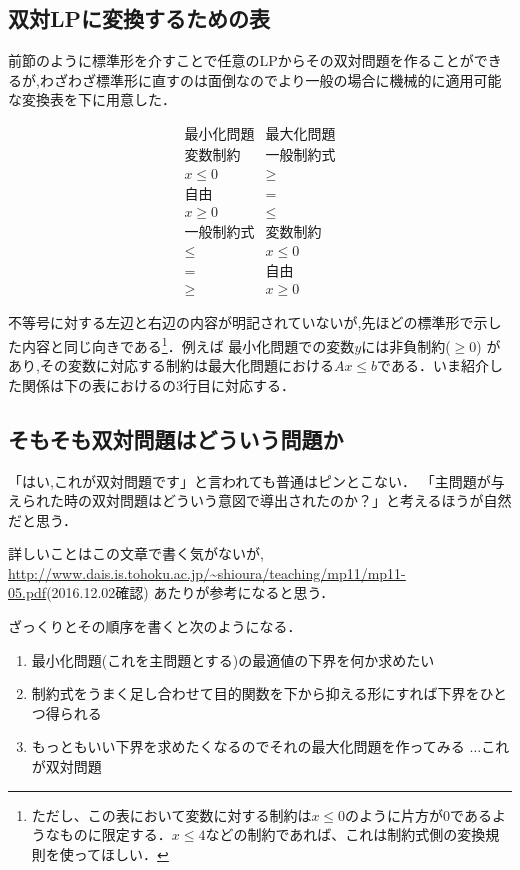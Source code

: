 \documentclass[13pt]{jarticle}
\theoremstyle{nonitalic} %
\begin{document}
\subsection{双対LPに変換するための表}

前節のように標準形を介すことで任意のLPからその双対問題を作ることができるが,わざわざ標準形に直すのは面倒なのでより一般の場合に機械的に適用可能な変換表を下に用意した．


\begin{equation*}
\begin{array}{c|c}
  \textrm{最小化問題} &  \textrm{最大化問題} \\ \hline \hline
  \textrm{変数制約}  &  \textrm{一般制約式} \\ \hline
  x \leq 0 & \geq \\
  \textrm{自由} & = \\
  x \geq 0 & \leq \\ \hline \hline
  \textrm{一般制約式} & \textrm{変数制約} \\ \hline
  \leq & x \leq 0 \\
   =   & \textrm{自由} \\
  \geq & x \geq 0
\end{array}
\end{equation*}

不等号に対する左辺と右辺の内容が明記されていないが,先ほどの標準形で示した内容と同じ向きである\footnote{ただし、この表において変数に対する制約は$x \leq 0$のように片方が0であるようなものに限定する．$ x \leq 4$などの制約であれば、これは制約式側の変換規則を使ってほしい．}．例えば 最小化問題での変数$y$には非負制約($ \geq 0$) があり,その変数に対応する制約は最大化問題における$Ax \leq b$である．いま紹介した関係は下の表におけるの3行目に対応する．

\subsection{そもそも双対問題はどういう問題か}
「はい,これが双対問題です」と言われても普通はピンとこない．
「主問題が与えられた時の双対問題はどういう意図で導出されたのか？」と考えるほうが自然だと思う．

詳しいことはこの文章で書く気がないが,
\url{http://www.dais.is.tohoku.ac.jp/~shioura/teaching/mp11/mp11-05.pdf}(2016.12.02確認) あたりが参考になると思う．

ざっくりとその順序を書くと次のようになる．
\begin{enumerate}
\item 最小化問題(これを主問題とする)の最適値の下界を何か求めたい
\item 制約式をうまく足し合わせて目的関数を下から抑える形にすれば下界をひとつ得られる
\item もっともいい下界を求めたくなるのでそれの最大化問題を作ってみる $\dots$これが双対問題
\end{enumerate}
\end{document}
